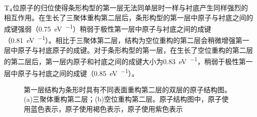 $\rm T_{4} \it$位原子的归位使得条形构型的第一层无法同单层时一样与衬底产生同样强烈的相互作用。在生长了三聚体重构第二层后，条形构型的第一层中原子与衬底之间的成键强弱（\SI{0.75}{\electronvolt\per\pair}）稍弱于极性第一层中原子与衬底之间的成键（\SI{0.81}{\electronvolt\per\pair}）。相比于三聚体第二层，结构为空位重构的第二层会稍微增强第一层中原子与衬底原子的成键。对于条形构型的第一层，在生长了空位重构的第二层的第二层后，第一层内原子和衬底之间的成键大小为\SI{0.83}{\electronvolt\per\pair}，稍弱于极性第一层中原子与衬底之间的成键（\SI{0.85}{\electronvolt\per\pair}）。

\begin{figure}[htb]
    \caption{第一层结构为条形时具有不同表面重构第二层的双层的原子结构图。(a)三聚体重构第二层；(b)空位重构第二层。原子结构图中，原子使用蓝色表示，原子使用褐色表示，原子使用紫色表示}
    \label{fig:IS_structure_2Linsb_22strip}
\end{figure}

